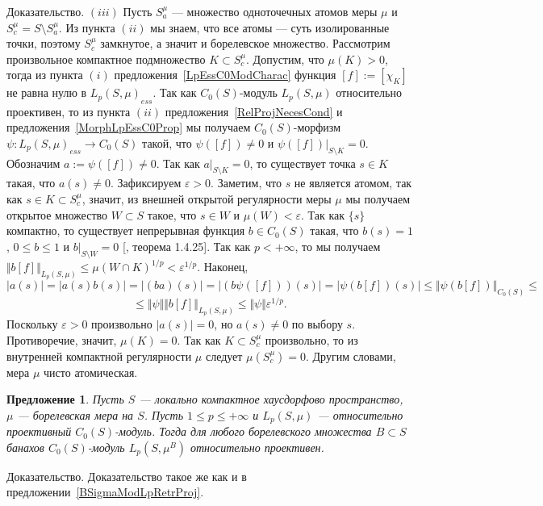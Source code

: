 \documentclass[12pt]{article}
\numberwithin{equation}{subsection}
\theoremstyle{plain}
\newtheorem{proposition}{Предложение}
\newenvironment{proof}{Доказательство.}{}
\begin{document}
\begin{fulltext}
\begin{proof}
        $(iii)$ Пусть $S_a^\mu$ --- множество одноточечных атомов меры $\mu$ и
        $S_c^\mu=S\setminus S_a^\mu$. Из пункта $(ii)$ мы знаем, что все атомы
        --- суть изолированные точки, поэтому $S_c^\mu$ замкнутое, а значит и
        борелевское множество. Рассмотрим произвольное компактное подмножество
        $K\subset S_c^\mu$. Допустим, что $\mu(K)>0$, тогда из пункта $(i)$
        предложения~\ref{LpEssC0ModCharac} функция $[f]:=[\chi_K]$ не равна нулю
        в ${L_p(S,\mu)}_{ess}$. Так как $C_0(S)$-модуль $L_p(S, \mu)$
        относительно проективен, то из пункта $(ii)$
        предложения~\ref{RelProjNecesCond} и предложения~\ref{MorphLpEssC0Prop}
        мы получаем $C_0(S)$-морфизм $\psi:{L_p(S,\mu)}_{ess}\to C_0(S)$ такой,
        что $\psi([f])\neq 0$ и $\psi([f])|_{S\setminus K}=0$. Обозначим
        $a:=\psi([f])\neq 0$. Так как $a|_{S\setminus K}=0$, то существует точка
        $s\in K$ такая, что $a(s)\neq 0$. Зафиксируем $\varepsilon > 0$.
        Заметим, что $s$ не является атомом, так как $s\in K\subset S_c^\mu$,
        значит, из внешней открытой регулярности меры $\mu$ мы получаем открытое
        множество $W\subset S$ такое, что $s\in W$ и $\mu(W)<\varepsilon$. Так
        как $\{s\}$ компактно, то существует непрерывная функция $b\in C_0(S)$
        такая, что $b(s)=1$, $0\leq b\leq 1$ и $b|_{S\setminus W}=0$
        [\cite{DalesBanSpContFunDualSp}, теорема 1.4.25]. Так как $p<+\infty$,
        то мы получаем $\Vert b[f]\Vert_{L_p(S,\mu)} \leq {\mu(W\cap
                K)}^{1/p}<\varepsilon^{1/p}$. Наконец,
        $$
            |a(s)|=|a(s)b(s)|=|(ba)(s)|=|(b\psi([f]))(s)|
            =|\psi(b[f])(s)|\leq\Vert \psi (b[f])\Vert_{C_0(S)}\leq
        $$
        $$
            \leq\Vert\psi\Vert\Vert b[f]\Vert_{L_p(S,\mu)}
            \leq\Vert\psi\Vert\varepsilon^{1/p}.
        $$
        Поскольку $\varepsilon>0$ произвольно $|a(s)|=0$, но $a(s)\neq 0$ по
        выбору $s$. Противоречие, значит, $\mu(K)=0$. Так как $K\subset S_c^\mu$
        произвольно, то из внутренней компактной регулярности $\mu$ следует
        $\mu(S_c^\mu)=0$. Другим словами, мера $\mu$ чисто атомическая.
    \end{proof}

    \begin{proposition}\label{C0ModLpRetrProj} Пусть $S$ --- локально компактное
        хаусдорфово пространст\-во, $\mu$ --- борелевская мера на $S$. Пусть
        $1\leq p\leq +\infty$ и $L_p(S,\mu)$ --- относительно проективный
        $C_0(S)$-модуль. Тогда для любого борелевского множества $B\subset S$
        банахов $C_0(S)$-модуль $L_p(S,\mu^B)$ относительно проективен.
    \end{proposition}
    \begin{proof} Доказательство такое же как и в
        предложении~\ref{BSigmaModLpRetrProj}.
    \end{proof}


\end{fulltext}
\end{document}
